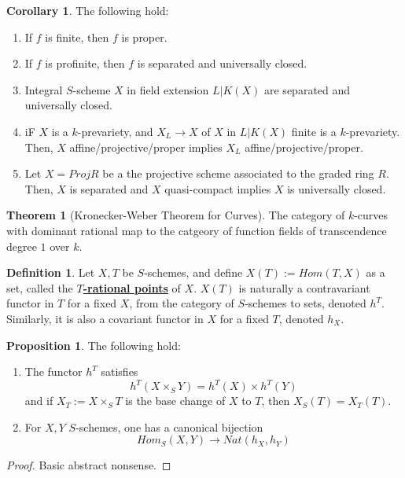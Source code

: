 \documentclass{article}
\theoremstyle{definition}
\newtheorem{theorem}{Theorem}[section]
\theoremstyle{definition}
\newtheorem{definition}{Definition}[theorem]
\theoremstyle{definition}
\theoremstyle{definition}
\newtheorem{proposition}{Proposition}[theorem]
\theoremstyle{definition}
\theoremstyle{definition}
\newtheorem{corollary}{Corollary}[theorem]
\theoremstyle{definition}
\begin{document}
\begin{tcolorbox}[colback=green!5!white,colframe=green!30!white]
\begin{corollary}
The following hold:
\begin{enumerate}
    \item If $f$ is finite, then $f$ is proper.
    \item If $f$ is profinite, then $f$ is separated and universally closed.
    \item Integral $S$-scheme $X$ in field extension $L|K(X)$ are separated and universally closed. 
    \item iF $X$ is a $k$-prevariety, and $X_L\to X$ of $X$ in $L|K(X)$ finite is a $k$-prevariety. Then, $X$ affine/projective/proper implies $X_L$ affine/projective/proper. 
    \item Let $X=Proj R$ be a the projective scheme associated to the graded ring $R$. Then, $X$ is separated and $X$ quasi-compact implies $X$ is universally closed. 
\end{enumerate}
\end{corollary}
\end{tcolorbox}


\begin{tcolorbox}[colback=red!5!white,colframe=red!30!white]
\begin{theorem}[Kronecker-Weber Theorem for Curves]
The category of $k$-curves with dominant rational map to the catgeory of function fields of transcendence degree $1$ over $k$. 
\end{theorem}
\end{tcolorbox}


\begin{tcolorbox}[colback=purple!5!white,colframe=purple!75!black]
\begin{definition}
Let $X,T$ be $S$-schemes, and define $X(T):= Hom(T,X)$ as a set, called the $T$\underline{\textbf{-rational points}} of $X$. $X(T)$ is naturally a contravariant functor in $T$ for a fixed $X$, from the category of $S$-schemes to sets, denoted $h^T$. Similarly, it is also a covariant functor in $X$ for a fixed $T$, denoted $h_X$.
\end{definition}
\end{tcolorbox}


\begin{tcolorbox}[colback=blue!5!white,colframe=blue!30!white]
\begin{proposition}
The following hold: 
\begin{enumerate}
    \item The functor $h^T$ satisfies
    \[h^T(X\times_S Y)=h^T(X)\times h^T(Y)\]
and if $X_T:= X\times_ST$ is the base change of $X$ to $T$, then $X_S(T)=X_T(T)$.
    \item For $X,Y$ $S$-schemes, one has a canonical bijection 
    \[Hom_S(X,Y)\to Nat(h_X,h_Y)\]
\end{enumerate}
\end{proposition}
\end{tcolorbox}
\begin{proof}
    Basic abstract nonsense.
\end{proof}
\end{document}
